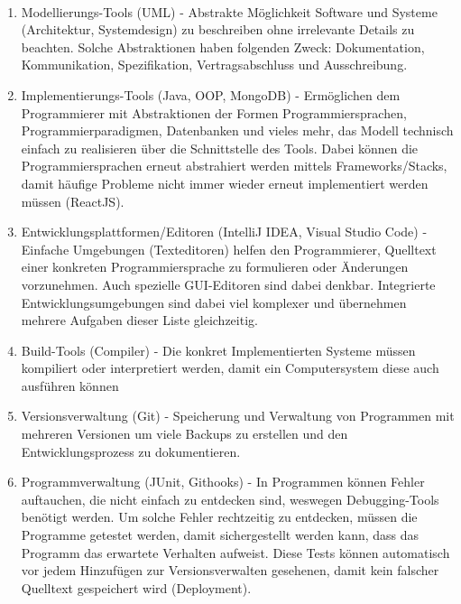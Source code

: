         \begin{loesung}\:
            \\[-.7cm]\begin{enumerate}
                \setlength\itemsep{0.1px}
                \item Modellierungs-Tools (UML) - Abstrakte Möglichkeit Software und Systeme (Architektur, Systemdesign) zu beschreiben ohne irrelevante Details zu beachten. Solche Abstraktionen haben folgenden Zweck: Dokumentation, Kommunikation, Spezifikation, Vertragsabschluss und Ausschreibung.
                \item Implementierungs-Tools (Java, OOP, MongoDB) - Ermöglichen dem Programmierer mit Abstraktionen der Formen Programmiersprachen, Programmierparadigmen, Datenbanken und vieles mehr, das Modell technisch einfach zu realisieren über die Schnittstelle des Tools. Dabei können die Programmiersprachen erneut abstrahiert werden mittels Frameworks/Stacks, damit häufige Probleme nicht immer wieder erneut implementiert werden müssen (ReactJS).
                \item Entwicklungsplattformen/Editoren (IntelliJ IDEA, Visual Studio Code) - Einfache Umgebungen (Texteditoren) helfen den Programmierer, Quelltext einer konkreten Programmiersprache zu formulieren oder Änderungen vorzunehmen. Auch spezielle GUI-Editoren sind dabei denkbar. Integrierte Entwicklungsumgebungen sind dabei viel komplexer und übernehmen mehrere Aufgaben dieser Liste gleichzeitig.
                \item Build-Tools (Compiler) - Die konkret Implementierten Systeme müssen kompiliert oder interpretiert werden, damit ein Computersystem diese auch ausführen können
                \item Versionsverwaltung (Git) - Speicherung und Verwaltung von Programmen mit mehreren Versionen um viele Backups zu erstellen und den Entwicklungsprozess zu dokumentieren.
                \item Programmverwaltung (JUnit, Githooks) - In Programmen können Fehler auftauchen, die nicht einfach zu entdecken sind, weswegen Debugging-Tools benötigt werden. Um solche Fehler rechtzeitig zu entdecken, müssen die Programme getestet werden, damit sichergestellt werden kann, dass das Programm das erwartete Verhalten aufweist. Diese Tests können automatisch vor jedem Hinzufügen zur Versionsverwalten gesehenen, damit kein falscher Quelltext gespeichert wird (Deployment).
            \end{enumerate}
        \end{loesung}
	
